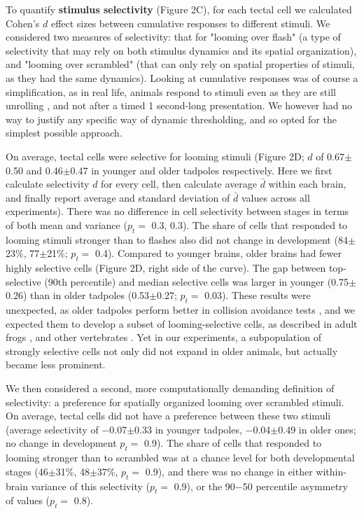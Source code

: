 \documentclass{article}
\begin{document}
To quantify \textbf{stimulus selectivity} (Figure 2C), for each tectal cell we calculated Cohen’s $d$ effect sizes between cumulative responses to different stimuli. We considered two measures of selectivity: that for "looming over flash" (a type of selectivity that may rely on both stimulus dynamics and its spatial organization), and "looming over scrambled" (that can only rely on spatial properties of stimuli, as they had the same dynamics). Looking at cumulative responses was of course a simplification, as in real life, animals respond to stimuli even as they are still unrolling \citep{peron2009adaptation, khakhalin2014}, and not after a timed 1 second-long presentation. We however had no way to justify any specific way of dynamic thresholding, and so opted for the simplest possible approach.

On average, tectal cells were selective for looming stimuli (Figure 2D; $d$ of 0.67$\pm$0.50 and 0.46$\pm$0.47 in younger and older tadpoles respectively. Here we first calculate selectivity $d$ for every cell, then calculate average $\bar d$ within each brain, and finally report average and standard deviation of $\bar d$ values across all experiments). There was no difference in cell selectivity between stages in terms of both mean and variance ($p_t=$ 0.3, 0.3). The share of cells that responded to looming stimuli stronger than to flashes also did not change in development (84$\pm$23\%, 77$\pm$21\%; $p_t=$ 0.4). Compared to younger brains, older brains had fewer highly selective cells (Figure 2D, right side of the curve). The gap between top-selective (90th percentile) and median selective cells was larger in younger (0.75$\pm$0.26) than in older tadpoles (0.53$\pm$0.27; $p_t=$ 0.03). These results were unexpected, as older tadpoles perform better in collision avoidance tests \citep{dong2009}, and we expected them to develop a subset of looming-selective cells, as described in adult frogs \citep{nakagawa2010otneurons, baranauskas2012}, and other vertebrates \citep{wang1992pigeon, wu2005pigeon, liu2011cat}. Yet in our experiments, a subpopulation of strongly selective cells not only did not expand in older animals, but actually became less prominent.

We then considered a second, more computationally demanding definition of selectivity: a preference for spatially organized looming over scrambled stimuli. On average, tectal cells did not have a preference between these two stimuli (average selectivity of $-$0.07$\pm$0.33 in younger tadpoles, $-$0.04$\pm$0.49 in older ones; no change in development $p_t=$ 0.9). The share of cells that responded to looming stronger than to scrambled was at a chance level for both developmental stages (46$\pm$31\%, 48$\pm$37\%, $p_t=$ 0.9), and there was no change in either within-brain variance of this selectivity ($p_t=$ 0.9), or the 90$-$50 percentile asymmetry of values ($p_t=$ 0.8).
\end{document}
